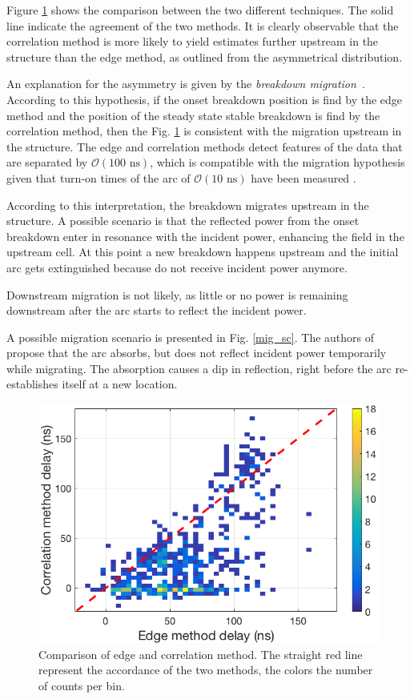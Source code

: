Figure \ref{comp_corr_edge} shows the comparison between the two different techniques. The solid line indicate the agreement of the two methods. It is clearly observable that the correlation method is more likely to yield estimates further upstream in the structure than the edge method, as outlined from the asymmetrical distribution. 

An explanation for the asymmetry is given by the \textit{breakdown migration}~\cite{Woolley:2015,Jacewicz:CLICWS16,Degiovanni:migration}. According to this hypothesis, if the onset breakdown position is find by the edge method and the position of the steady state stable breakdown is find by the correlation method, then the Fig. \ref{comp_corr_edge} is consistent with the migration upstream in the structure. The edge and correlation methods detect features of the data that are separated by $\mathcal{O}(100 \text{ ns})$, which is compatible with the migration hypothesis given that turn-on times of the arc of $\mathcal{O}(10 \text{ ns})$ have been measured \cite{smtg,smtgg}.

According to this interpretation, the breakdown migrates upstream in the structure. A possible scenario is that the reflected power from the onset breakdown enter in resonance with the incident power, enhancing the field in the upstream cell. At this point a new breakdown happens upstream and the initial arc gets extinguished because do not receive incident power anymore. 

Downstream migration is not likely, as little or no power is remaining downstream after the arc starts to reflect the incident power. 

A possible migration scenario is presented in Fig.  \ref{mig_sc}. The authors of \cite{Degiovanni:migration} propose that the arc absorbs, but does not reflect incident power temporarily while migrating. The absorption causes a dip in reflection, right before the arc re-establishes itself at a new location.

\begin{figure}[h]
\centering 
\includegraphics[scale=0.5]{pictures/methods_comparison.png}
\caption{Comparison of edge and correlation method. The straight red line represent the accordance of the two methods, the colors the number of counts per bin. }
\label{comp_corr_edge}
\end{figure}

